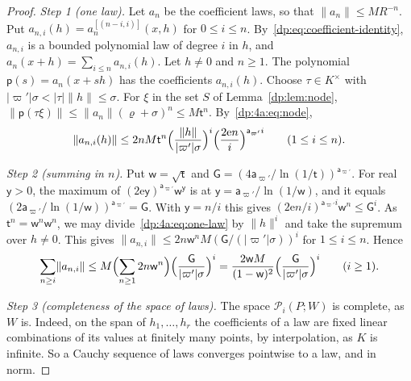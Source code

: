 \documentclass[11pt]{amsart}
\theoremstyle{definition}
\theoremstyle{remark}
\numberwithin{equation}{section}
\newcommand{\abs}[1]{\lvert #1\rvert}
\newcommand{\norm}[1]{\lVert #1\rVert}
\theoremstyle{plain}
\theoremstyle{definition}
\theoremstyle{plain}
\newcommand{\cP}{\mathcal P}
\begin{document}
\begin{proof}
\emph{Step 1 (one law).} Let $a_n$ be the coefficient laws, so that $\norm{a_n}\le MR^{-n}$. Put $a_{n,i}(h)=a_n^{[(n-i,i)]}(x,h)$ for $0\le i\le n$. By~\eqref{dp:eq:coefficient-identity}, $a_{n,i}$ is a bounded polynomial law of degree $i$ in $h$, and $a_n(x+h)=\sum_{i\le n}a_{n,i}(h)$. Let $h\ne0$ and $n\ge1$. The polynomial $\mathsf p(s)=a_n(x+sh)$ has the coefficients $a_{n,i}(h)$. Choose $\tau\in K^\times$ with $\abs{\varpi'}\sigma<\abs\tau\norm h\le\sigma$. For $\xi$ in the set $S$ of Lemma~\ref{dp:lem:node}, $\norm{\mathsf p(\tau\xi)}\le\norm{a_n}(\varrho+\sigma)^n\le M\mathsf t^n$. By~\eqref{dp:4a:eq:node},
\begin{equation}\label{dp:4a:eq:one-law}
 \norm{a_{n,i}(h)}\le2nM\mathsf t^n\Bigl(\frac{\norm h}{\abs{\varpi'}\sigma}\Bigr)^i\Bigl(\frac{2\mathrm en}i\Bigr)^{\mathsf a_{\varpi'} i}\qquad(1\le i\le n).
\end{equation}

\emph{Step 2 (summing in $n$).} Put $\mathsf w=\sqrt{\mathsf t}$ and $\mathsf G=(4\mathsf a_{\varpi'}/\ln(1/\mathsf t))^{\mathsf a_{\varpi'}}$. For real $\mathsf y>0$, the maximum of $(2\mathrm e\mathsf y)^{\mathsf a_{\varpi'}}\mathsf w^{\mathsf y}$ is at $\mathsf y=\mathsf a_{\varpi'}/\ln(1/\mathsf w)$, and it equals $(2\mathsf a_{\varpi'}/\ln(1/\mathsf w))^{\mathsf a_{\varpi'}}=\mathsf G$. With $\mathsf y=n/i$ this gives $(2\mathrm en/i)^{\mathsf a_{\varpi'} i}\mathsf w^n\le\mathsf G^i$. As $\mathsf t^n=\mathsf w^n\mathsf w^n$, we may divide~\eqref{dp:4a:eq:one-law} by $\norm h^i$ and take the supremum over $h\ne0$. This gives $\norm{a_{n,i}}\le2n\mathsf w^nM(\mathsf G/(\abs{\varpi'}\sigma))^i$ for $1\le i\le n$. Hence
\begin{equation}\label{dp:4a:eq:sum-n}
 \sum_{n\ge i}\norm{a_{n,i}}\le M\Bigl(\sum_{n\ge1}2n\mathsf w^n\Bigr)\Bigl(\frac{\mathsf G}{\abs{\varpi'}\sigma}\Bigr)^i=\frac{2\mathsf wM}{(1-\mathsf w)^2}\Bigl(\frac{\mathsf G}{\abs{\varpi'}\sigma}\Bigr)^i\qquad(i\ge1).
\end{equation}

\emph{Step 3 (completeness of the space of laws).} The space $\cP_i(P;W)$ is complete, as $W$ is. Indeed, on the span of $h_1,\dots,h_r$ the coefficients of a law are fixed linear combinations of its values at finitely many points, by interpolation, as $K$ is infinite. So a Cauchy sequence of laws converges pointwise to a law, and in norm.


\end{proof}
\end{document}
